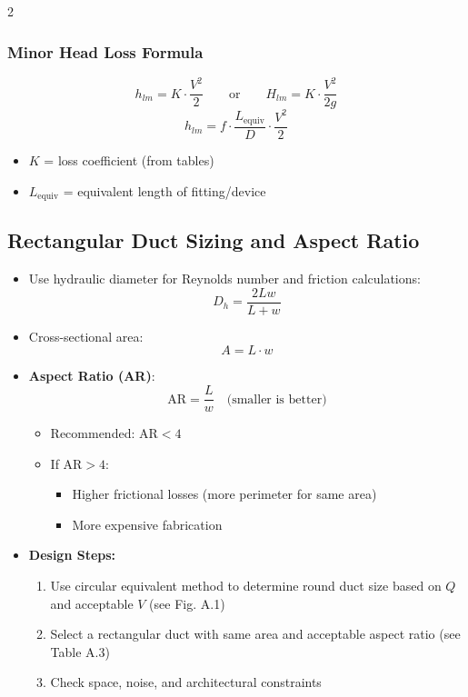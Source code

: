 \begin{multicols*}{2}
    \subsubsection{Minor Head Loss Formula}
    \[
        h_{lm} = K \cdot \frac{V^2}{2} \qquad \text{or} \qquad H_{lm} = K \cdot \frac{V^2}{2g}
    \]
    \[
        h_{lm} = f \cdot \frac{L_{\text{equiv}}}{D} \cdot \frac{V^2}{2}
    \]
    \begin{itemize}
        \item $K$ = loss coefficient (from tables)
        \item $L_{\text{equiv}}$ = equivalent length of fitting/device
    \end{itemize}

    \subsection{Rectangular Duct Sizing and Aspect Ratio}
    \begin{itemize}
        \item Use hydraulic diameter for Reynolds number and friction calculations:
              \[
                  D_h = \frac{2Lw}{L + w}
              \]
        \item Cross-sectional area:
              \[
                  A = L \cdot w
              \]
        \item \textbf{Aspect Ratio (AR)}:
              \[
                  \text{AR} = \frac{L}{w} \quad \text{(smaller is better)}
              \]
              \begin{itemize}
                  \item Recommended: $\text{AR} < 4$
                  \item If $\text{AR} > 4$:
                        \begin{itemize}
                            \item Higher frictional losses (more perimeter for same area)
                            \item More expensive fabrication
                        \end{itemize}
              \end{itemize}
        \item \textbf{Design Steps:}
              \begin{enumerate}
                  \item Use circular equivalent method to determine round duct size based on $Q$ and acceptable $V$ (see Fig. A.1)
                  \item Select a rectangular duct with same area and acceptable aspect ratio (see Table A.3)
                  \item Check space, noise, and architectural constraints
              \end{enumerate}
    \end{itemize}


\end{multicols*}
